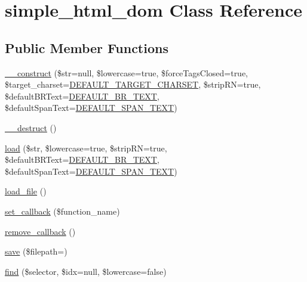\hypertarget{classsimple__html__dom}{}\section{simple\+\_\+html\+\_\+dom Class Reference}
\label{classsimple__html__dom}
\subsection*{Public Member Functions}
\begin{DoxyCompactItemize}
\item 
\hyperlink{classsimple__html__dom_a867090eb38a7d76f8df0b46d22a5226a}{\+\_\+\+\_\+construct} (\$str=null, \$lowercase=true, \$force\+Tags\+Closed=true, \$target\+\_\+charset=\hyperlink{simple__html__dom_8php_aeb01f6d83a65d695ad327473f838319a}{D\+E\+F\+A\+U\+L\+T\+\_\+\+T\+A\+R\+G\+E\+T\+\_\+\+C\+H\+A\+R\+S\+E\+T}, \$strip\+R\+N=true, \$default\+B\+R\+Text=\hyperlink{simple__html__dom_8php_a898bdf60fe4d05c1c50013eed5e2c6e8}{D\+E\+F\+A\+U\+L\+T\+\_\+\+B\+R\+\_\+\+T\+E\+X\+T}, \$default\+Span\+Text=\hyperlink{simple__html__dom_8php_a30d58d7d3a53efc61f064b53a434bafe}{D\+E\+F\+A\+U\+L\+T\+\_\+\+S\+P\+A\+N\+\_\+\+T\+E\+X\+T})
\item 
\hyperlink{classsimple__html__dom_a421831a265621325e1fdd19aace0c758}{\+\_\+\+\_\+destruct} ()
\item 
\hyperlink{classsimple__html__dom_a240a32865f9d9ea1fa681917547a65a5}{load} (\$str, \$lowercase=true, \$strip\+R\+N=true, \$default\+B\+R\+Text=\hyperlink{simple__html__dom_8php_a898bdf60fe4d05c1c50013eed5e2c6e8}{D\+E\+F\+A\+U\+L\+T\+\_\+\+B\+R\+\_\+\+T\+E\+X\+T}, \$default\+Span\+Text=\hyperlink{simple__html__dom_8php_a30d58d7d3a53efc61f064b53a434bafe}{D\+E\+F\+A\+U\+L\+T\+\_\+\+S\+P\+A\+N\+\_\+\+T\+E\+X\+T})
\item 
\hyperlink{classsimple__html__dom_acbf45344758b1a521534cc9cc8ebc5f5}{load\+\_\+file} ()
\item 
\hyperlink{classsimple__html__dom_a40e8b7bf2a1b1acc56b82f9221fb9266}{set\+\_\+callback} (\$function\+\_\+name)
\item 
\hyperlink{classsimple__html__dom_a0af324763ae6d1a475455af727fc5037}{remove\+\_\+callback} ()
\item 
\hyperlink{classsimple__html__dom_a6e80614bedc0513a210906c36f608fa8}{save} (\$filepath=\textquotesingle{}\textquotesingle{})
\item 
\hyperlink{classsimple__html__dom_afbf375e355aa32c25f7e389a04ddced0}{find} (\$selector, \$idx=null, \$lowercase=false)

\end{DoxyCompactItemize}
